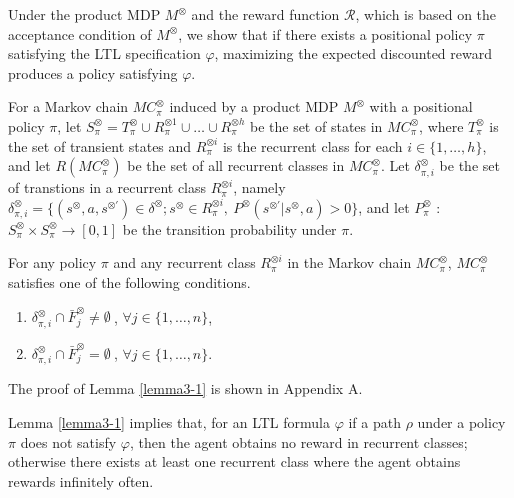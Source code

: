 Under the product MDP $M^{\otimes}$ and the reward function $\mathcal{R}$, which is based on the acceptance condition of $ M^\otimes $, we show that if there exists a positional policy $\pi$ satisfying the LTL specification $\varphi$, maximizing the expected discounted reward produces a policy satisfying $\varphi$.

For a Markov chain $MC^{\otimes}_{\pi}$ induced by a product MDP $M^{\otimes}$ with a positional policy $\pi$, let $S^{\otimes}_{\pi}= T^{\otimes}_{\pi} \cup R^{\otimes 1}_{\pi} \cup \ldots \cup R^{\otimes h}_{\pi}$ be the set of states in $MC^{\otimes}_{\pi}$, where $T^{\otimes}_{\pi}$ is the set of transient states and $R^{\otimes i}_{\pi}$ is the recurrent class for each $i \in \{ 1, \ldots ,h \}$, and let $R(MC^{\otimes}_{\pi})$ be the set of all recurrent classes in $MC^{\otimes}_{\pi}$. Let $\delta^{\otimes}_{\pi,i}$ be the set of transtions in a recurrent class $R^{\otimes i}_{\pi}$, namely $\delta^{\otimes}_{\pi,i} = \{ (s^{\otimes},a,s^{\otimes \prime}) \in \delta^{\otimes} ; s^{\otimes} \in R^{\otimes i}_{\pi},\ P^{\otimes}(s^{\otimes \prime}|s^{\otimes},a) > 0 \}$, and let $P^{\otimes}_{\pi}$ : $S^{\otimes}_{\pi} \times S^{\otimes}_{\pi} \rightarrow [0,1]$ be the transition probability under $\pi$.

\begin{lemma}
  For any policy $\pi$ and any recurrent class $R^{\otimes i}_{\pi}$ in the Markov chain $MC^{\otimes}_{\pi}$,
  $MC^{\otimes}_{\pi}$ satisfies one of the following conditions.
  \vspace{2mm}
  \begin{enumerate}
    \item $\delta^{\otimes}_{\pi,i} \cap \bar{F}^{\otimes}_j \neq \emptyset\ $, $ \forall j \in \{ 1, \ldots ,n \}$,
    \item $\delta^{\otimes}_{\pi,i} \cap \bar{F}^{\otimes}_j = \emptyset\ $, $ \forall j \in \{ 1, \ldots ,n \}$.
  \end{enumerate}
  \label{lemma3-1}
\end{lemma}
The proof of Lemma \ref{lemma3-1} is shown in Appendix A.

Lemma \ref{lemma3-1} implies that, for an LTL formula $\varphi$ if a path $\rho$ under a policy $\pi$ does not satisfy $\varphi$, then the agent obtains no reward in recurrent classes; otherwise there exists at least one recurrent class where the agent obtains rewards infinitely often.


